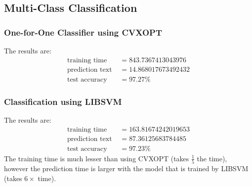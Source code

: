 \documentclass[11pt]{article}
\begin{document}
\subsection{Multi-Class Classification}

\subsubsection{One-for-One Classifier using CVXOPT}
The results are:
\begin{equation}
  \begin{split}
    \text{training time }&= 843.7367413043976\\
    \text{prediction text }&= 14.868017673492432\\
    \text{test accuracy }&= 97.27\%
  \end{split}
\end{equation}

\subsubsection{Classification using LIBSVM}
The results are:
\begin{equation}
  \begin{split}
    \text{training time }&= 163.81674242019653\\
    \text{prediction text }&= 87.36125683784485\\
    \text{test accuracy }&= 97.23\%
  \end{split}
\end{equation}
The training time is much lesser than using CVXOPT (takes $\frac{1}{5}$ the time), however the prediction time is larger with the model that is trained by LIBSVM (takes $6 \times$ time).
\end{document}
